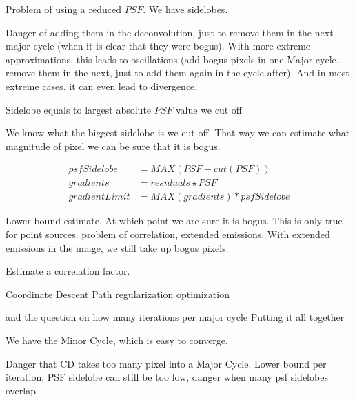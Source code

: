 Problem of using a reduced $PSF$. We have sidelobes.

Danger of adding them in the deconvolution, just to remove them in the next major cycle (when it is clear that they were bogus). With more extreme approximations, this leads to oscillations (add bogus pixels in one Major cycle, remove them in the next, just to add them again in the cycle after). And in most extreme cases, it can even lead to divergence.

Sidelobe equals to largest absolute $PSF$ value we cut off

We know what the biggest sidelobe is we cut off. That way we can estimate what magnitude of pixel we can be sure that it is bogus. 

\begin{equation}
\begin{split}
psfSidelobe &= MAX(PSF - cut(PSF)) \\
gradients &= residuals \star PSF \\
gradientLimit &= MAX(gradients) * psfSidelobe
\end{split}
\end{equation}

Lower bound estimate. At which point we are sure it is bogus.
This is only true for point sources. 
problem of correlation, extended emissions. With extended emissions in the image, we still take up bogus pixels. 

Estimate a correlation factor. 


Coordinate Descent Path regularization optimization \cite{friedman2010regularization}





\cite{clark1980efficient} and the question on how many iterations per major cycle
Putting it all together

We have the Minor Cycle, which is easy to converge.


Danger that CD takes too many pixel into a Major Cycle. Lower bound per iteration, PSF sidelobe
can still be too low, danger when many psf sidelobes overlap